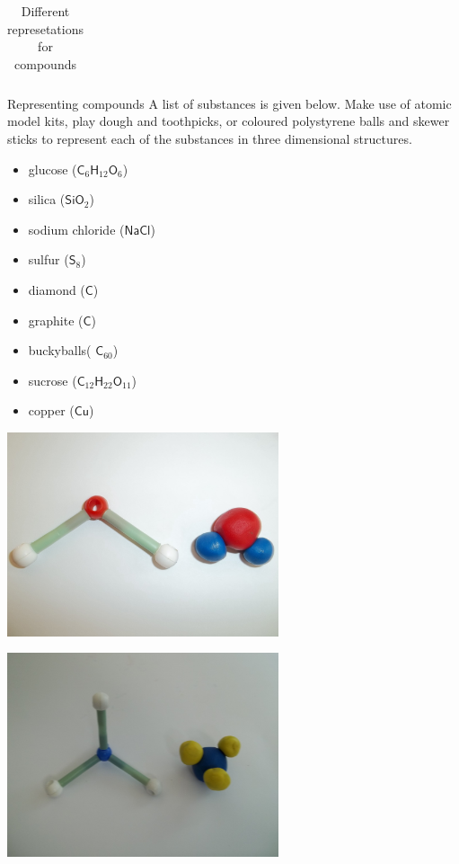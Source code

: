 \begin{enumerate}[noitemsep, label=\textbf{\arabic*}. ]
\begin{table}[H]
\begin{center}
\begin{tabular}{|l|l|l|l|l|}
  \end{tabular}
 \end{center}
\caption{Different represetations for compounds}
\label{tab:atommodels}
\end{table}

\begin{Activity}{Representing compounds}
A list of substances is given below. Make use of atomic model kits, play dough and toothpicks, or coloured polystyrene balls and skewer sticks to represent each of the substances in three dimensional structures.\\
\begin{minipage}{.3\textwidth}
\begin{itemize}
 \item glucose ($\mathsf{C}_{6}\mathsf{H}_{12}\mathsf{O}_{6}$)
\item silica ($\mathsf{SiO}_{2}$)
\item sodium chloride ($\mathsf{NaCl}$)
\item sulfur ($\mathsf{S}_{8}$)
\item diamond ($\mathsf{C}$)
\item graphite ($\mathsf{C}$)
\item buckyballs( $\mathsf{C}_{60}$)
\item sucrose ($\mathsf{C}_{12}\mathsf{H}_{22}\mathsf{O}_{11}$)
\item copper ($\mathsf{Cu}$)
\end{itemize}
\end{minipage}
\begin{minipage}{.4\textwidth}
\begin{center}
\includegraphics[width=0.6\textwidth]{photos/water.jpg}
\end{center}  
\end{minipage}
\begin{minipage}{.4\textwidth}
\begin{center}
\includegraphics[width=0.6\textwidth]{photos/ammonia.jpg}

\end{center}
\end{minipage}
\end{Activity}
\end{enumerate}
